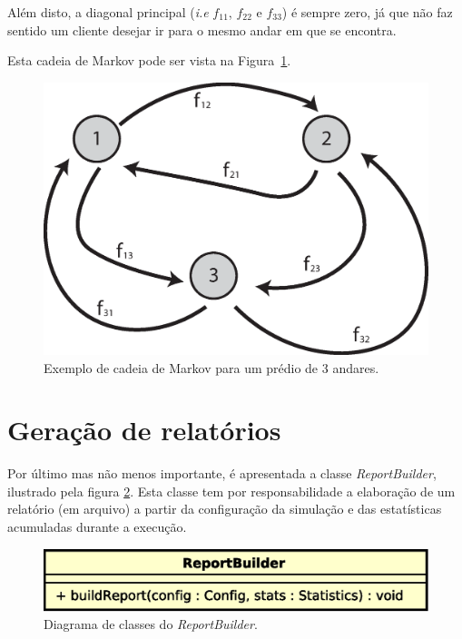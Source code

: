 Além disto, a diagonal principal (\textit{i.e} $f_{11}$, $f_{22}$ e
$f_{33}$) é sempre zero, já que não faz sentido um cliente desejar ir para o
mesmo andar em que se encontra.

Esta cadeia de Markov pode ser vista na Figura~\ref{fig:distribution:markov}.

\begin{figure}[htb!]
  \centering
  \includegraphics[scale=0.6]{img/markov.eps}
  \caption{Exemplo de cadeia de Markov para um prédio de 3 andares.}
\label{fig:distribution:markov}
\end{figure}

\section{\label{sec:model:report}Geração de relatórios}

Por último mas não menos importante, é apresentada a classe
\textit{ReportBuilder}, ilustrado pela figura \ref{fig:diagram:report}. Esta
classe tem por responsabilidade a elaboração de um relatório (em arquivo) a
partir da configuração da simulação e das estatísticas acumuladas durante a
execução.

\begin{figure}[htb!]
  \centering
  \includegraphics[scale=0.6]{img/Report.eps}
  \caption{Diagrama de classes do \textit{ReportBuilder}.}
\label{fig:diagram:report}
\end{figure}


